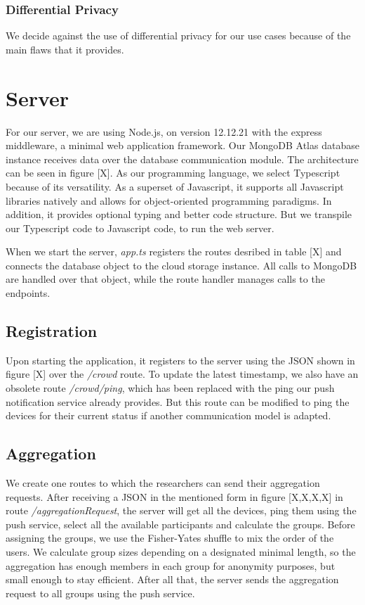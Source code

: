 \subsubsection{Differential Privacy}
We decide against the use of differential privacy for our use cases because of the main flaws that it provides.
\section{Server}
For our server, we are using Node.js,
on version 12.12.21 with the express middleware, a minimal web application framework.
Our MongoDB Atlas database instance
receives data over the database communication module. The architecture can be seen in figure [X].
As our programming language, we select Typescript because of its versatility. As a superset of Javascript, it supports all Javascript libraries natively and allows for object-oriented programming paradigms. In addition, it provides optional typing and better code structure. But we transpile our Typescript code to Javascript code, to run the web server.

When we start the server, \textit{app.ts} registers the routes desribed in table [X] and connects the database object to the cloud storage instance. All calls to MongoDB are handled over that object, while the route handler manages calls to the endpoints.

\subsection{Registration}

Upon starting the application, it registers to the server using the JSON shown in figure [X] over the \textit{/crowd} route. To update the latest timestamp, we also have an obsolete route \textit{/crowd/ping}, which has been replaced with the ping our push notification service already provides. But this route can be modified to ping the devices for their current status if another communication model is adapted.

\subsection{Aggregation}

We create one routes to which the researchers can send their aggregation requests. After receiving a JSON in the mentioned form in figure [X,X,X,X] in route \textit{/aggregationRequest}, the server will get all the devices, ping them using the push service, select all the available participants and calculate the groups. Before assigning the groups, we use the Fisher-Yates shuffle to mix the order of the users. We calculate group sizes depending on a designated minimal length, so the aggregation has enough members in each group for anonymity purposes, but small enough to stay efficient. After all that, the server sends the aggregation request to all groups using the push service.

